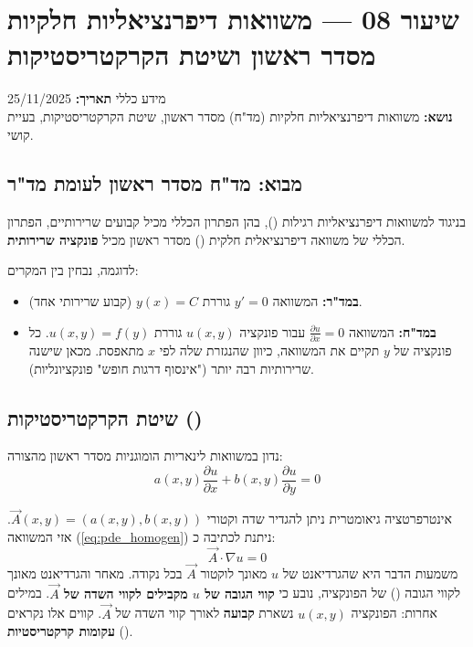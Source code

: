 \section{שיעור 08 — משוואות דיפרנציאליות חלקיות מסדר ראשון ושיטת הקרקטריסטיקות}

\begin{mainbox}{מידע כללי}
\textbf{תאריך:} 25/11/2025\\
\textbf{נושא:} משוואות דיפרנציאליות חלקיות (מד"ח) מסדר ראשון, שיטת הקרקטריסטיקות, בעיית קושי.
\end{mainbox}

\subsection{מבוא: מד"ח מסדר ראשון לעומת מד"ר}

בניגוד למשוואות דיפרנציאליות רגילות (), בהן הפתרון הכללי מכיל קבועים שרירותיים, הפתרון הכללי של משוואה דיפרנציאלית חלקית () מסדר ראשון מכיל \textbf{פונקציה שרירותית}.

לדוגמה, נבחין בין המקרים:
\begin{itemize}
    \item \textbf{במד"ר:} המשוואה $y' = 0$ גוררת $y(x) = C$ (קבוע שרירותי אחד).
    \item \textbf{במד"ח:} המשוואה $\frac{\partial u}{\partial x} = 0$ עבור פונקציה $u(x,y)$ גוררת $u(x,y) = f(y)$. כל פונקציה של $y$ תקיים את המשוואה, כיוון שהנגזרת שלה לפי $x$ מתאפסת. מכאן שישנה שרירותיות רבה יותר ("אינסוף דרגות חופש" פונקציונליות).
\end{itemize}

\subsection{שיטת הקרקטריסטיקות ()}

נדון במשוואות לינאריות הומוגניות מסדר ראשון מהצורה:
\begin{equation}
    a(x,y)\frac{\partial u}{\partial x} + b(x,y)\frac{\partial u}{\partial y} = 0
    \label{eq:pde_homogen}
\end{equation}

\begin{definitionbox}{אינטרפרטציה גיאומטרית}
ניתן להגדיר שדה וקטורי $\vec{A}(x,y) = (a(x,y), b(x,y))$. אזי המשוואה (\ref{eq:pde_homogen}) ניתנת לכתיבה כ:
\[ \vec{A} \cdot \nabla u = 0 \]
משמעות הדבר היא שהגרדיאנט של $u$ מאונך לוקטור $\vec{A}$ בכל נקודה. מאחר והגרדיאנט מאונך לקווי הגובה () של הפונקציה, נובע כי \textbf{קווי הגובה של $u$ מקבילים לקווי השדה של $\vec{A}$}.
במילים אחרות: הפונקציה $u(x,y)$ נשארת \textbf{קבועה} לאורך קווי השדה של $\vec{A}$. קווים אלו נקראים \textbf{עקומות קרקטריסטיות} ().
\end{definitionbox}

